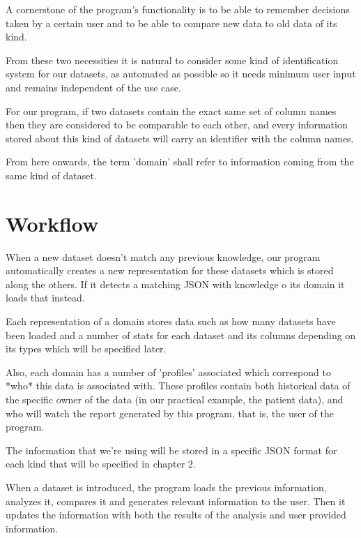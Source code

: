A cornerstone of the program's functionality is to be able to remember decisions taken by a certain user and to be able to compare new data to old data of its kind.

From these two necessities it is natural to consider some kind of identification system for our datasets, as automated as possible so it needs minimum user input and remains independent of the use case.

For our program, if two datasets contain the exact same set of column names then they are considered to be comparable to each other, and every information stored about this kind of datasets will carry an identifier with the column names.

From here onwards, the term 'domain' shall refer to information coming from the same kind of dataset.

\section{Workflow}
\label{cap1:sec:workflow}

When a new dataset doesn't match any previous knowledge, our program automatically creates a new representation for these datasets which is stored along the others. If it detects a matching JSON with knowledge o its domain it loads that instead.

Each representation of a domain stores data such as how many datasets have been loaded and a number of stats for each dataset and its columns depending on its types which will be specified later.

Also, each domain has a number of 'profiles' associated which correspond to *who* this data is associated with. These profiles contain both historical data of the specific owner of the data (in our practical example, the patient data), and who will watch the report generated by this program, that is, the user of the program.

The information that we're using will be stored in a specific JSON format for each kind that will be specified in chapter 2.

When a dataset is introduced, the program loads the previous information, analyzes it, compares it and generates relevant information to the user. Then it updates the information with both the results of the analysis and user provided information.

